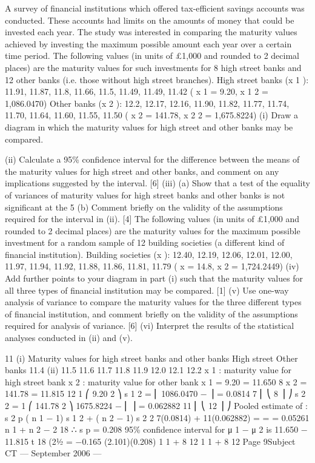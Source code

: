 \documentclass[a4paper,12pt]{article}
\begin{document}
\begin{enumerate}

A survey of financial institutions which offered tax-efficient savings accounts was
conducted. These accounts had limits on the amounts of money that could be
invested each year. The study was interested in comparing the maturity values
achieved by investing the maximum possible amount each year over a certain time
period.
The following values (in units of £1,000 and rounded to 2 decimal places) are the
maturity values for such investments for 8 high street banks and 12 other banks (i.e.
those without high street branches).
High street banks (x 1 ): 11.91, 11.87, 11.8, 11.66, 11.5, 11.49, 11.49, 11.42
( x 1 = 9.20, x 1 2 = 1,086.0470)
Other banks (x 2 ): 12.2, 12.17, 12.16, 11.90, 11.82, 11.77, 11.74, 11.70, 11.64, 11.60,
11.55, 11.50
( x 2 = 141.78, x 2 2 = 1,675.8224)
(i) Draw a diagram in which the maturity values for high street and other banks
may be compared.

(ii) Calculate a 95\% confidence interval for the difference between the means of the maturity values for high street and other banks, and comment on any
implications suggested by the interval.
[6]
(iii) (a)
Show that a test of the equality of variances of maturity values for high street banks and other banks is not significant at the 5%
(b)
Comment briefly on the validity of the assumptions required for the interval in (ii).
[4]
The following values (in units of £1,000 and rounded to 2 decimal places) are the
maturity values for the maximum possible investment for a random sample of 12
building societies (a different kind of financial institution).
Building societies (x  ): 12.40, 12.19, 12.06, 12.01, 12.00, 11.97, 11.94, 11.92, 11.88,
11.86, 11.81, 11.79
( x  = 14.8, x  2 = 1,724.2449)
(iv) Add further points to your diagram in part (i) such that the maturity values for
all three types of financial institution may be compared.
[1]
(v) Use one-way analysis of variance to compare the maturity values for the three different types of financial institution, and comment briefly on the validity of
the assumptions required for analysis of variance.
[6]
(vi) Interpret the results of the statistical analyses conducted in (ii) and (v).

\newpage
11
(i)
Maturity values for high street banks and other banks
High street
Other banks
11.4
(ii)
11.5
11.6
11.7
11.8
11.9
12.0
12.1
12.2
x 1 : maturity value for high street bank
x 2 : maturity value for other bank
x 1 = 9.20
= 11.650
8
x 2 = 141.78
= 11.815
12
1 ⎛
9.20 2 ⎞
s 1 2 = ⎜ 1086.0470 −
⎟ = 0.0814
7 ⎜ ⎝
8 ⎟ ⎠
s 2 2 =
1 ⎛
141.78 2 ⎞
1675.8224
−
⎜
⎟ = 0.062882
11 ⎜ ⎝
12 ⎟ ⎠
Pooled estimate of \sigma:
s 2 p
( n 1 − 1) s 1 2 + ( n 2 − 1) s 2 2 7(0.0814) + 11(0.062882)
=
=
= 0.05261
n 1 + n 2 − 2
18
∴ s p = 0.208
95\% confidence interval for μ 1 − μ 2 is
11.650 − 11.815 \pm t 18 (21⁄2%
= −0.165 \pm (2.101)(0.208)
1 1
+
8 12
1 1
+
8 12
Page 9Subject CT  — September 2006 — 


\end{enumerate}
\end{document}
